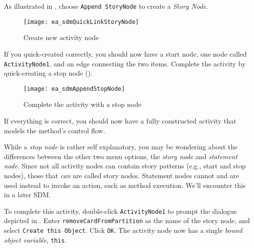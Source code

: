 \begin{stepbystep}
\item As illustrated in , choose \texttt{Append StoryNode} to create a \emph{Story Node}.

\begin{figure}[htp]
\begin{center}
  \texttt{[image: ea\_sdmQuickLinkStoryNode]}
  \caption{Create new activity node}  
  \label{ea:sdm_new_activity_node}
\end{center}
\end{figure}

\item If you quick-created correctly, you should now have a start node, one node called \texttt{ActivityNode1}, and an edge
connecting the two items. Complete the activity by quick-creating a stop node ().

\begin{figure}[htp]
\begin{center}
  \texttt{[image: ea\_sdmAppendStopNode]}
  \caption{Complete the activity with a stop node}  
  \label{ea:sdm_stop_node}
\end{center}
\end{figure}

\vspace{0.5cm}

\item If everything is correct, you should now have a fully constructed activity that models the method's control flow.

\item While a \emph{stop node} is rather self explanatory, you may be wondering about the differences between the other two menu options,
the \emph{story node} and \emph{statement node}. Since not all activity nodes can contain story patterns (e.g., start
and stop nodes), those that \emph{can} are called story nodes. Statement nodes cannot and are used instead to invoke an action, such as method execution. We'll
encounter this in a later SDM.

\item To complete this activity, double-click \texttt{ActivityNode1} to prompt the dialogue depicted in
. Enter \texttt{removeCardFromPartition} as the name of the story node, and select \texttt{Create this Object}.  Click
\texttt{OK}. The activity node now has a single \emph{bound} \emph{object variable}, \texttt{this}.


\end{stepbystep}
